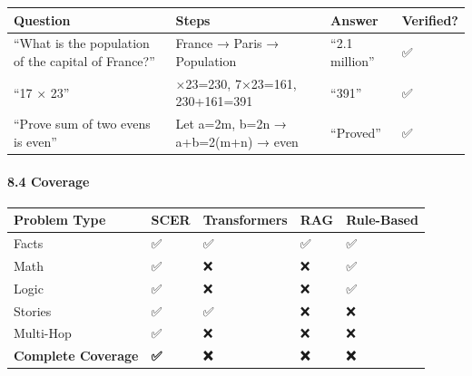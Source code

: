 \documentclass[
  11pt,
  a4paper,
]{article}
\begin{document}
\begin{longtable}[]{@{}
  >{\raggedright\arraybackslash}p{}
  >{\raggedright\arraybackslash}p{}
  >{\raggedright\arraybackslash}p{}
  >{\raggedright\arraybackslash}p{}@{}}
\toprule\noalign{}
\begin{minipage}[b]{\linewidth}\raggedright
Question
\end{minipage} & \begin{minipage}[b]{\linewidth}\raggedright
Steps
\end{minipage} & \begin{minipage}[b]{\linewidth}\raggedright
Answer
\end{minipage} & \begin{minipage}[b]{\linewidth}\raggedright
Verified?
\end{minipage} \\
\midrule\noalign{}
\endhead
\bottomrule\noalign{}
\endlastfoot
``What is the population of the capital of France?'' & France → Paris →
Population & ``2.1 million'' & ✅ \\
``17 × 23'' & 10×23=230, 7×23=161, 230+161=391 & ``391'' & ✅ \\
``Prove sum of two evens is even'' & Let a=2m, b=2n → a+b=2(m+n) → even
& ``Proved'' & ✅ \\
\end{longtable}

\paragraph{8.4 Coverage}\label{coverage}

\begin{longtable}[]{@{}lllll@{}}
\toprule\noalign{}
Problem Type & SCER & Transformers & RAG & Rule-Based \\
\midrule\noalign{}
\endhead
\bottomrule\noalign{}
\endlastfoot
Facts & ✅ & ✅ & ✅ & ✅ \\
Math & ✅ & ❌ & ❌ & ✅ \\
Logic & ✅ & ❌ & ❌ & ✅ \\
Stories & ✅ & ✅ & ❌ & ❌ \\
Multi-Hop & ✅ & ❌ & ❌ & ❌ \\
\textbf{Complete Coverage} & \textbf{✅} & \textbf{❌} & \textbf{❌} &
\textbf{❌} \\
\end{longtable}
\end{document}
